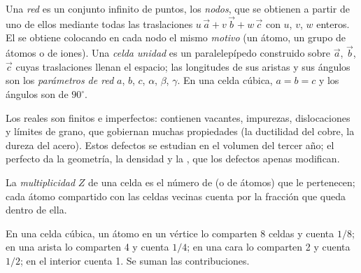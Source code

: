 \begin{definition}\label{def:b1:crystals-metals:lattice}
Una \emph{red} es un conjunto infinito de puntos, los
\emph{nodos}, que se obtienen a partir de uno de ellos
mediante todas las traslaciones $u\,\vec a + v\,\vec b + w\,\vec c$ con
$u$, $v$,
$w$ enteros. El  se obtiene colocando en cada nodo el mismo
\emph{motivo} (un átomo, un grupo de átomos o de iones).
Una \emph{celda unidad} es un paralelepípedo
construido sobre $\vec a$, $\vec b$, $\vec c$ cuyas traslaciones llenan el
espacio; las longitudes de sus aristas y sus ángulos son los
\emph{parámetros de red}
$a$, $b$, $c$, $\alpha$, $\beta$, $\gamma$. En una celda cúbica,
$a = b = c$ y los ángulos son de $90^\circ$.
\end{definition}

\begin{remark}\label{rem:b1:crystals-metals:real}
Los  reales son finitos e imperfectos: contienen vacantes,
impurezas, dislocaciones y límites de grano, que gobiernan muchas
propiedades (la ductilidad del cobre, la dureza del acero). Estos
defectos se estudian en el volumen del tercer año; el  perfecto da
la geometría, la densidad y la , que los defectos apenas
modifican.
\end{remark}

\begin{definition}\label{def:b1:crystals-metals:multiplicity}
La \emph{multiplicidad} $Z$ de una celda es el número
de  (o de átomos) que le pertenecen; cada átomo compartido con
las celdas vecinas cuenta por la fracción que queda dentro de ella.
\end{definition}

\begin{method}\label{met:b1:crystals-metals:count}
En una celda cúbica, un átomo en un vértice lo comparten 8 celdas y
cuenta $1/8$; en una arista lo comparten 4 y cuenta $1/4$; en una cara lo
comparten 2 y cuenta $1/2$; en el interior cuenta 1. Se suman las
contribuciones.
\end{method}

